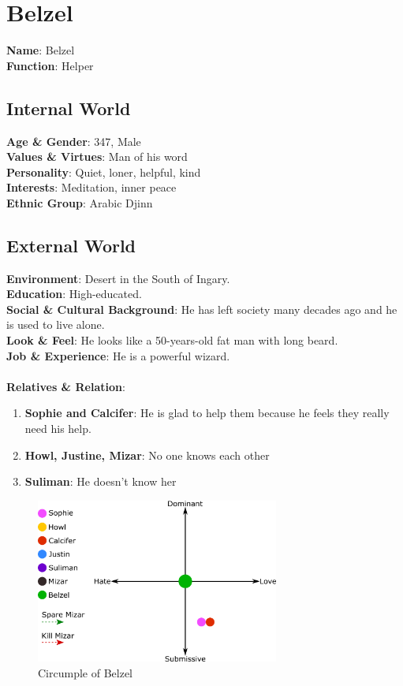 \section{Belzel}

\textbf{Name}: Belzel \\
\textbf{Function}: Helper

\subsection{Internal World}

\textbf{Age \& Gender}: 347, Male \\
\textbf{Values \& Virtues}: Man of his word  \\
\textbf{Personality}: Quiet, loner, helpful, kind \\
\textbf{Interests}: Meditation, inner peace \\
\textbf{Ethnic Group}: Arabic Djinn

\subsection{External World}
\textbf{Environment}: Desert in the South of Ingary.  \\
\textbf{Education}: High-educated. \\
\textbf{Social \& Cultural Background}: He has left society many decades ago and he is used to live alone. \\
\textbf{Look \& Feel}: He looks like a 50-years-old fat man with long beard. \\
\textbf{Job \& Experience}: He is a powerful wizard. \\
\\
\textbf{Relatives \& Relation}:
\begin{enumerate}
\item \textbf{Sophie and Calcifer}: He  is glad to help them because he feels they really need his help.
\item \textbf{Howl, Justine, Mizar}: No one knows each other
\item \textbf{Suliman}: He doesn’t know her
\end{enumerate}

\begin{figure}
  \centering
  \includegraphics[width=8cm]{Images/Circumplexes/belzelCircumplex}
  \caption{Circumple of Belzel}
\end{figure}

